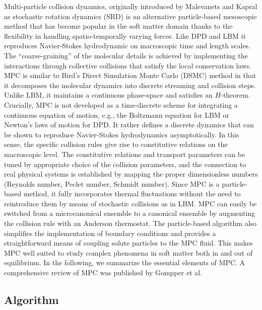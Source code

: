 \documentclass[8.5pt,twoside,twocolumn]{article}
\begin{document}
Multi-particle collision dynamics, originally introduced by Malevanets and Kapral\cite{Malevanets:1999,Malevanets:2001,Gompper:2009} as stochastic rotation dynamics (SRD) is an alternative particle-based mesoscopic method that has become popular in the soft matter domain thanks to the flexibility in handling spatio-temporally varying forces. Like DPD and LBM it reproduces Navier-Stokes hydrodynamic on macroscopic time and length scales. The ``coarse-graining'' of the molecular details is achieved by implementing the interactions through collective collisions that satisfy the local conservation laws. MPC is similar to Bird's Direct Simulation Monte Carlo (DSMC) method \cite{Bird:1994} in that it decomposes the molecular dynamics into discrete streaming and collision steps. Unlike LBM, it maintains a continuous phase-space and satisfies an $H$-theorem.\cite{Malevanets:1999,Ihle:2003} Crucially, MPC is not developed as a time-discrete scheme for integrating a continuous equation of motion, e.g., the Boltzmann equation for LBM or Newton's laws of motion for DPD. It rather defines a discrete dynamics that can be shown to reproduce Navier-Stokes hydrodynamics asymptotically. In this sense, the specific collision rules give rise to constitutive relations on the macroscopic level. The constitutive relations and transport parameters can be tuned by appropriate choice of the collision parameters, and the connection to real physical systems is established by mapping the proper dimensionless numbers (Reynolds number, Peclet number, Schmidt number).\cite{Padding:2006} Since MPC is a particle-based method, it fully incorporates thermal fluctuations without the need to reintroduce them by means of stochastic collisions as in LBM.\cite{Ladd:1994a,Adhikari:2005,Duenweg:2007,Duenweg:2008a,Gross:2010} MPC can easily be switched from a microcanonical ensemble to a canonical ensemble by augmenting the collision rule with an Anderson thermostat. The particle-based algorithm also simplifies the implementation of boundary conditions and provides a straightforward means of coupling solute particles to the MPC fluid. This makes MPC well suited to study complex phenomena in soft matter both in and out of equilibrium.
%
In the following, we summarize the essential elements of MPC. A comprehensive review of MPC was published by Gompper et al.\cite{Gompper:2009}

\subsection{Algorithm}
\end{document}
